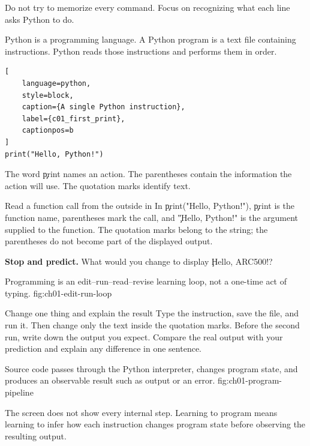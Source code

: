 Do not try to memorize every command. Focus on recognizing what each line asks
Python to do.


Python is a programming language. A Python program is a text file containing
instructions. Python reads those instructions and performs them in order.

\begin{lstlisting}[
    language=python,
    style=block,
    caption={A single Python instruction},
    label={c01_first_print},
    captionpos=b
]
print("Hello, Python!")
\end{lstlisting}

The word \c{print} names an action. The parentheses contain the information the
action will use. The quotation marks identify text.

\begin{SyntaxBox}{Read a function call from the outside in}
In \c{print("Hello, Python!")}, \c{print} is the function name,
parentheses mark the call, and \c{"Hello, Python!"} is the argument supplied
to the function. The quotation marks belong to the string; the parentheses do
not become part of the displayed output.
\end{SyntaxBox}

\begin{NoteBox}
\textbf{Stop and predict.} What would you change to display
\c{Hello, ARC500!}?
\end{NoteBox}

{Programming is an edit--run--read--revise learning loop, not a one-time act of typing.}
{fig:ch01-edit-run-loop}

\begin{TryBox}{Change one thing and explain the result}
Type the instruction, save the file, and run it. Then change only the text
inside the quotation marks. Before the second run, write down the output you
expect. Compare the real output with your prediction and explain any
difference in one sentence.
\end{TryBox}

{Source code passes through the Python interpreter, changes program state, and produces an observable result such as output or an error.}
{fig:ch01-program-pipeline}

The screen does not show every internal step. Learning to program means
learning to infer how each instruction changes program state before observing
the resulting output.

